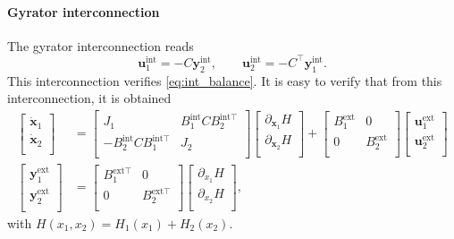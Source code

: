 \paragraph{Gyrator interconnection}
The gyrator interconnection reads
\begin{equation*}
\bm{u}_1^{\text{int}} = - {C} \bm{y}_2^{\text{int}}, \qquad
\bm{u}_2^{\text{int}} = - {C}^\top \bm{y}_1^{\text{int}}.
\end{equation*}
This interconnection verifies \eqref{eq:int_balance}. It is easy to verify that from this interconnection, it is obtained
\begin{align*}
\begin{bmatrix}
\dot{\bm{x}}_1 \\ \dot{\bm{x}}_2 \\
\end{bmatrix} &= 
\begin{bmatrix}
{J}_1 & {B}_1^{\text{int}} {C} {B}_2^{\text{int} \top} \\ 
- {B}_2^{\text{int}} {C} {B}_1^{\text{int} \top}  & {J}_2 \\
\end{bmatrix}
\begin{bmatrix}
\partial_{\bm{x}_1}{H} \\ 
\partial_{\bm{x}_2}{H} \\
\end{bmatrix}+ 
\begin{bmatrix}
{B}_1^{\text{ext}} & 0 \\ 0 & {B}_2^{\text{ext}} \\
\end{bmatrix} 
\begin{bmatrix}
\bm{u}_1^{\text{ext}} \\ \bm{u}_2^{\text{ext}} \\
\end{bmatrix}  \\
\begin{bmatrix}
\bm{y}_1^{\text{ext}} \\ \bm{y}_2^{\text{ext}} \\
\end{bmatrix}  &= \begin{bmatrix}
B_1^{\text{ext} \top} & 0 \\
0 & B_2^{\text{ext} \top} \\
\end{bmatrix} \begin{bmatrix}
\partial_{x_1}{H} \\ 
\partial_{x_2}{H} \\
\end{bmatrix},
\end{align*}
with $H(x_1, x_2) = H_1(x_1) + H_2(x_2)$.

